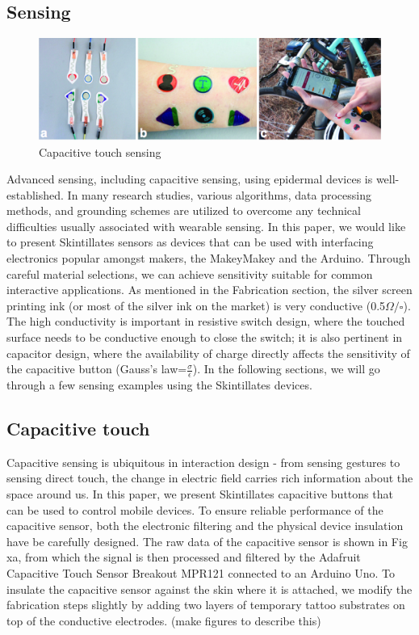 \documentclass{sigchi}
\begin{document}
\subsection{Sensing}
\begin{figure}[!h]
\centering
\includegraphics[width=1.0\textwidth]{figures/Figure7}
\caption{Capacitive touch sensing}
\label{fig:figure7}
\end{figure}
Advanced sensing, including capacitive sensing, using epidermal devices is well-established. In many research studies, various algorithms, data processing methods, and grounding schemes are utilized to overcome any technical difficulties usually associated with wearable sensing. In this paper, we would like to present Skintillates sensors as devices that can be used with interfacing electronics popular amongst makers, the MakeyMakey and the Arduino. Through careful material selections, we can achieve sensitivity suitable for common interactive applications. As mentioned in the Fabrication section, the silver screen printing ink (or most of the silver ink on the market) is very conductive (0.5$\Omega/\square$). The high conductivity is important in resistive switch design, where the touched surface needs to be conductive enough to close the switch; it is also pertinent in capacitor design, where the availability of charge directly affects the sensitivity of the capacitive button (Gauss’s law=$\frac{\sigma}{\epsilon}$). In the following sections, we will go through a few sensing examples using the Skintillates devices. 

\subsection {Capacitive touch}

Capacitive sensing is ubiquitous in interaction design - from sensing gestures to sensing direct touch, the change in electric field carries rich information about the space around us. In this paper, we present Skintillates capacitive buttons that can be used to control mobile devices. To ensure reliable performance of the capacitive sensor, both the electronic filtering and the physical device insulation have be carefully designed. The raw data of the capacitive sensor is shown in Fig xa, from which the signal is then processed and filtered by the Adafruit Capacitive Touch Sensor Breakout MPR121 connected to an Arduino Uno. To insulate the capacitive sensor against the skin where it is attached, we modify the fabrication steps slightly by adding two layers of temporary tattoo substrates on top of the conductive electrodes. (make figures to describe this)
\end{document}

